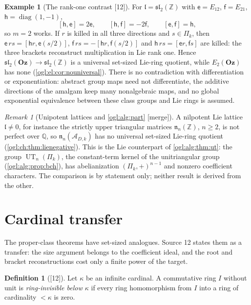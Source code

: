 \documentclass[11pt,oneside]{article}
\numberwithin{equation}{section}
\theoremstyle{definition}
\newtheorem{definition}[definition]{Definition}
\newtheorem{example}[example]{Example}
\theoremstyle{remark}
\newtheorem{remark}[remark]{Remark}
\newcommand{\Oz}{\mathbf{Oz}}
\newcommand{\Z}{\mathbb Z}
\newcommand{\Q}{\mathbb Q}
\newcommand{\A}{\mathcal A}
\newcommand{\UT}{\operatorname{UT}}
\newcommand{\diag}{\operatorname{diag}}
\newcommand{\src}[1]{\textup{\textsf{\small[#1]}}}
\newcommand{\mergetag}{\textup{\textsf{\small[merge]}}}
\begin{document}
\begin{example}[The rank-one contrast \src{12}]\label{ogl:ch:ex:sl2}
For $\mathfrak l=\mathfrak{sl}_2(\Z)$ with $\mathsf e=E_{12}$, $\mathsf f=E_{21}$,
$\mathsf h=\diag(1,-1)$,
\begin{equation}\label{ogl:ch:eq:sl2}
 [\mathsf h,\mathsf e]=2\mathsf e,\qquad [\mathsf h,\mathsf f]=-2\mathsf f,\qquad
 [\mathsf e,\mathsf f]=\mathsf h,
\end{equation}
so $m=2$ works. If $r$ is killed in all three directions and $s\in\Pi_k$, then
$\mathsf e\,rs=[\mathsf h r,\mathsf e(s/2)]$, $\mathsf f\,rs=-[\mathsf h r,\mathsf f(s/2)]$ and
$\mathsf h\,rs=[\mathsf e r,\mathsf f s]$ are killed: the three brackets
reconstruct multiplication in Lie rank one. Hence
$\mathfrak{sl}_2(\Oz)\to\mathfrak{sl}_2(\Z)$ is a universal set-sized Lie-ring
quotient, while $E_2(\Oz)$ has none (\cref{ogl:el:cor:nouniversal}). There is
no contradiction with differentiation or exponentiation: abstract group maps
need not differentiate, the additive directions of the amalgam keep many
nonalgebraic maps, and no global exponential equivalence between these class
groups and Lie rings is assumed.
\end{example}

\begin{remark}[Unipotent lattices and \cref{ogl:alg:part} \mergetag]\label{ogl:ch:rem:unipotent}
A nilpotent Lie lattice $\mathfrak l\ne0$, for instance the strictly upper
triangular matrices $\mathfrak n_n(\Z)$, $n\ge2$, is not perfect over $\Q$, so
$\mathfrak n_n(\A_{D,k})$ has no universal set-sized Lie-ring quotient
(\cref{ogl:ch:thm:lienegative}). This is the Lie counterpart of
\cref{ogl:alg:thm:ut}: the group $\UT_n(\Pi_k)$, the constant-term kernel of the
unitriangular group (\cref{ogl:alg:prop:bch}), has abelianization
$(\Pi_k,+)^{n-1}$ and nonzero coefficient characters. The comparison is by
statement only; neither result is derived from the other.
\end{remark}

\section{Cardinal transfer}\label{ogl:ch:sec:cardinals}

The proper-class theorems have set-sized analogues. Source 12 states them as a
transfer: the size argument belongs to the coefficient ideal, and the root and
bracket reconstructions cost only a finite power of the target.

\begin{definition}[\src{12}]\label{ogl:ch:def:invisiblebelow}
Let $\kappa$ be an infinite cardinal. A commutative ring $I$ without unit is
\emph{ring-invisible below $\kappa$} if every ring homomorphism from $I$ into a
ring of cardinality $<\kappa$ is zero.
\end{definition}
\end{document}

